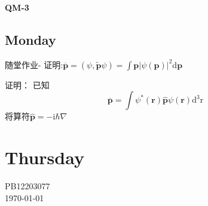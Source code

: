 \documentclass[a4paper,11pt]{article}
\begin{document}
    \LARGE \textbf{\textrm{QM-3}}\\[3pt]
    \begin{CJK*}{UTF8}{kai}
    \section{Monday}
    随堂作业- 证明:\quad$\overline{\textbf{p}} = (\psi , \widetilde{\textbf{p}}\psi)
    = \displaystyle\int \textbf{p}|\psi (\textbf{p})|^{2}\mathrm{d}\textbf{p}$\\[6pt]
    \end{CJK*}
    
    \begin{CJK*}{UTF8}{song}
    \noindent 证明： 已知
    $$\overline{\textbf{p}} = \int \psi ^{*} (\textbf{r})\hat{\textbf{p}}\psi (\textbf{r})\mathrm{d^{3} r}$$
    将算符$\displaystyle \hat{\textbf{p}} = -\mathrm{i} \hbar \nabla$
    \end{CJK*}    
    
    \section{Thursday}
    \begin{CJK*}{UTF8}{kai}
        \begin{flushright}
            \small PB12203077\\
            \footnotesize \today
        \end{flushright}
    \end{CJK*}
\end{document}
